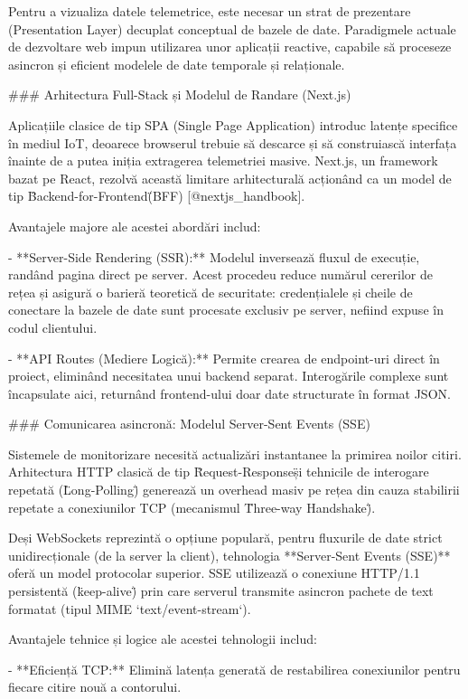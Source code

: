 Pentru a vizualiza datele telemetrice, este necesar un strat de
prezentare (Presentation Layer) decuplat conceptual de bazele de date.
Paradigmele actuale de dezvoltare web impun utilizarea unor aplicații
reactive, capabile să proceseze asincron și eficient modelele de date
temporale și relaționale.

### Arhitectura Full-Stack și Modelul de Randare (Next.js)

Aplicațiile clasice de tip SPA (Single Page Application) introduc
latențe specifice în mediul IoT, deoarece browserul trebuie să descarce
și să construiască interfața înainte de a putea iniția extragerea
telemetriei masive. Next.js, un framework bazat pe React, rezolvă
această limitare arhitecturală acționând ca un model de tip
\"Backend-for-Frontend\" (BFF) [@nextjs_handbook].

Avantajele majore ale acestei abordări includ:

- **Server-Side Rendering (SSR):** Modelul inversează fluxul de
  execuție, randând pagina direct pe server. Acest procedeu reduce
  numărul cererilor de rețea și asigură o barieră teoretică de
  securitate: credențialele și cheile de conectare la bazele de date
  sunt procesate exclusiv pe server, nefiind expuse în codul clientului.

- **API Routes (Mediere Logică):** Permite crearea de endpoint-uri
  direct în proiect, eliminând necesitatea unui backend separat.
  Interogările complexe sunt încapsulate aici, returnând frontend-ului
  doar date structurate în format JSON.

### Comunicarea asincronă: Modelul Server-Sent Events (SSE)

Sistemele de monitorizare necesită actualizări instantanee la primirea
noilor citiri. Arhitectura HTTP clasică de tip \"Request-Response\" și
tehnicile de interogare repetată (\"Long-Polling\") generează un
overhead masiv pe rețea din cauza stabilirii repetate a conexiunilor TCP
(mecanismul \"Three-way Handshake\").

Deși WebSockets reprezintă o opțiune populară, pentru fluxurile de date
strict unidirecționale (de la server la client), tehnologia
**Server-Sent Events (SSE)** oferă un model protocolar superior. SSE
utilizează o conexiune HTTP/1.1 persistentă (\"keep-alive\") prin care
serverul transmite asincron pachete de text formatat (tipul MIME
`text/event-stream`).

Avantajele tehnice și logice ale acestei tehnologii includ:

- **Eficiență TCP:** Elimină latența generată de restabilirea
  conexiunilor pentru fiecare citire nouă a contorului.

